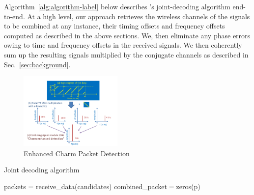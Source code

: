  \vspace*{0.1in}

 Algorithm~\ref{alg:algorithm-label} below describes \name's joint-decoding algorithm end-to-end. At a high level, our approach retrieves the wireless channels of the signals to be combined at any instance, their timing offsets and frequency offsets computed as described in the above sections. We, then eliminate any phase errors owing to time and frequency offsets in the received signals. We then coherently sum up the resulting signals multiplied by the conjugate channels as described in Sec.~\ref{sec:background}. 

\begin{figure}
    \centering
    \includegraphics[width=0.45\textwidth]{location-aware-network/figures/CharmEnhancedDetection.pdf}
    \caption{Enhanced Charm Packet Detection}
    \label{fig:enhanced_charm}
\end{figure}



\LinesNumbered
\begin{algorithm}[ht]
\caption{Joint decoding algorithm}
\label{alg:algorithm-label}
 packets = receive\_data(candidates)\;
 combined\_packet$=$zeros(p)\;
 \end{algorithm}



